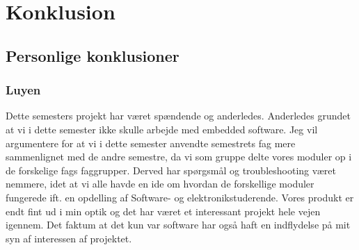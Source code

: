 \section{Konklusion}

\subsection{Personlige konklusioner}

\subsubsection{Luyen}
Dette semesters projekt har været spændende og anderledes. Anderledes grundet at vi i dette semester ikke skulle arbejde med embedded software. Jeg vil argumentere for at vi i dette semester anvendte semestrets fag mere sammenlignet med de andre semestre, da vi som gruppe delte vores moduler op i de forskelige fags faggrupper. Derved har spørgsmål og troubleshooting været nemmere, idet at vi alle havde en ide om hvordan de forskellige moduler fungerede ift. en opdelling af Software- og elektronikstuderende. 
Vores produkt er endt fint ud i min optik og det har været et interessant projekt hele vejen igennem. Det faktum at det kun var software har også haft en indflydelse på mit syn af interessen af projektet.